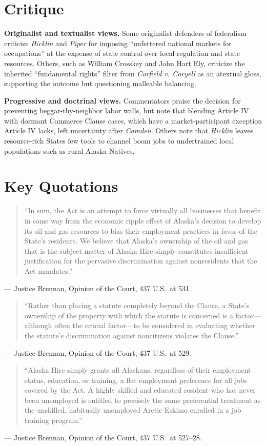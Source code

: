 \documentclass[12pt]{article}
\begin{document}
\section{Critique}

\textbf{Originalist and textualist views.} Some originalist defenders of federalism criticize \textit{Hicklin} and \textit{Piper} for imposing ``unfettered national markets for occupations'' at the expense of state control over local regulation and state resources. Others, such as William Crosskey and John Hart Ely, criticize the inherited ``fundamental rights'' filter from \textit{Corfield v. Coryell} as an atextual gloss, supporting the outcome but questioning malleable balancing.

\textbf{Progressive and doctrinal views.} Commentators praise the decision for preventing beggar-thy-neighbor labor walls, but note that blending Article IV with dormant Commerce Clause cases, which have a market-participant exception Article IV lacks, left uncertainty after \textit{Camden}. Others note that \textit{Hicklin} leaves resource-rich States few tools to channel boom jobs to undertrained local populations such as rural Alaska Natives.

\section{Key Quotations}

\begin{quote}
``In sum, the Act is an attempt to force virtually all businesses that benefit in some way from the economic ripple effect of Alaska's decision to develop its oil and gas resources to bias their employment practices in favor of the State's residents. We believe that Alaska's ownership of the oil and gas that is the subject matter of Alaska Hire simply constitutes insufficient justification for the pervasive discrimination against nonresidents that the Act mandates.''
\end{quote}
\noindent --- Justice Brennan, Opinion of the Court, 437 U.S.\ at 531.

\begin{quote}
``Rather than placing a statute completely beyond the Clause, a State's ownership of the property with which the statute is concerned is a factor---although often the crucial factor---to be considered in evaluating whether the statute's discrimination against noncitizens violates the Clause.''
\end{quote}
\noindent --- Justice Brennan, Opinion of the Court, 437 U.S.\ at 529.

\begin{quote}
``Alaska Hire simply grants all Alaskans, regardless of their employment status, education, or training, a flat employment preference for all jobs covered by the Act. A highly skilled and educated resident who has never been unemployed is entitled to precisely the same preferential treatment as the unskilled, habitually unemployed Arctic Eskimo enrolled in a job training program.''
\end{quote}
\noindent --- Justice Brennan, Opinion of the Court, 437 U.S.\ at 527--28.
\end{document}
